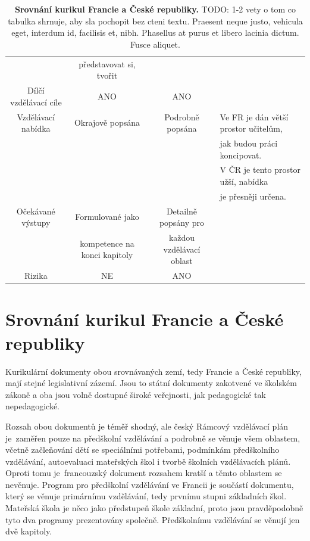 \begin{landscape}
\begin{table}[t]
\begin{tabular}{|c|c|c|l|}
\rowcolor{grey!10}
					& představovat si, tvořit 	&						& 	\\		
\rowcolor{grey!50}
Dílčí vzdělávací cíle	& ANO					& ANO 					& 	\\	
\rowcolor{grey!10}
Vzdělávací nabídka	& Okrajově popsána	 		& Podrobně popsána	 	& Ve FR je dán větší prostor učitelům, 	\\
\rowcolor{grey!10}
					&							&						& jak budou práci koncipovat. 			\\
\rowcolor{grey!10}
					&							&						& V ČR je tento prostor užší, nabídka 	\\
\rowcolor{grey!10}
					&							&						& je přesněji určena. 					\\
\rowcolor{grey!50}
Očekávané výstupy	& Formulované jako 				& Detailně popsány pro 		& 		\\ 
\rowcolor{grey!50}
					& kompetence na konci kapitoly 	& každou vzdělávací oblast 	& 		\\
\rowcolor{grey!10}
Rizika	 			& NE						& ANO	 						& 		\\
\hline
\end{tabular}
\caption{ \textbf{Srovnání kurikul Francie a České republiky.}
	TODO: 1-2 vety o tom co tabulka shrnuje, aby sla pochopit bez cteni textu. Praesent neque justo, vehicula eget, interdum id, facilisis et, nibh. Phasellus at purus et libero lacinia dictum. Fusce aliquet.
}
\label{tab:srovnaniKurikul}
\end{table}
\end{landscape}

\section{Srovnání kurikul Francie a České republiky}
	Kurikulární dokumenty obou srovnávaných zemí, tedy Francie a České republiky, mají stejné legislativní zázemí. Jsou to státní dokumenty zakotvené ve školském zákoně a oba jsou volně dostupné široké veřejnosti, jak pedagogické tak nepedagogické. 

	Rozsah obou dokumentů je téměř shodný, ale český Rámcový vzdělávací plán je zaměřen pouze na předškolní vzdělávání a podrobně se věnuje všem oblastem, včetně začleňování dětí se speciálními potřebami, podmínkám předškolního vzdělávání, autoevaluaci mateřských škol i tvorbě školních vzdělávacích plánů. Oproti tomu je francouzský dokument rozsahem kratší a těmto oblastem se nevěnuje. Program pro předškolní vzdělávání ve Francii je součástí dokumentu, který se věnuje primárnímu vzdělávání, tedy prvnímu stupni základních škol. Mateřská škola je něco jako předstupeň škole základní, proto jsou pravděpodobně tyto dva programy prezentovány společně. Předškolnímu vzdělávání se věnují jen dvě kapitoly.

